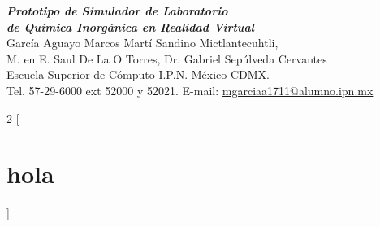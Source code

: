 \pagestyle{plain}
\centering
\textbf{\textit{\large{Prototipo de Simulador de Laboratorio \\ de Química Inorgánica en Realidad Virtual}}}\\

García Aguayo Marcos Martí Sandino Mictlantecuhtli,\\ M. en E. Saul De La O Torres, Dr. Gabriel Sepúlveda Cervantes\\

Escuela Superior de Cómputo I.P.N. México CDMX.\\
Tel. 57-29-6000 ext 52000 y 52021. E-mail: \href{mailto:mgarciaa1711@alumno.ipn.mx}{mgarciaa1711@alumno.ipn.mx}\newline

\begin{multicols}{2}
[
    \section*{hola}
]
\end{multicols}